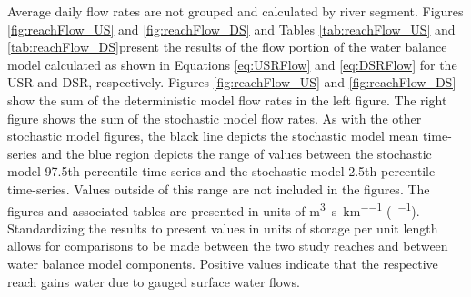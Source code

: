 \begin{linenumbers}
Average daily flow rates are not grouped and calculated by river segment.  Figures \ref{fig:reachFlow_US} and \ref{fig:reachFlow_DS} and Tables \ref{tab:reachFlow_US} and \ref{tab:reachFlow_DS}present the results of the flow portion of the water balance model calculated as shown in Equations \ref{eq:USRFlow} and \ref{eq:DSRFlow} for the USR and DSR, respectively.  Figures \ref{fig:reachFlow_US} and \ref{fig:reachFlow_DS} show the sum of the deterministic model flow rates in the left figure.  The right figure shows the sum of the stochastic model flow rates.  As with the other stochastic model figures, the black line depicts the stochastic model mean time-series and the blue region depicts the range of values between the stochastic model 97.5th percentile time-series and the stochastic model 2.5th percentile time-series.  Values outside of this range are not included in the figures.  The figures and associated tables are presented in units of \si{\cubic\meter\per\second\per\kilo\meter} (\si{\cfs\per\mile}).  Standardizing the results to present values in units of storage per unit length allows for comparisons to be made between the two study reaches and between water balance model components.  Positive values indicate that the respective reach gains water due to gauged surface water flows.


\end{linenumbers}
